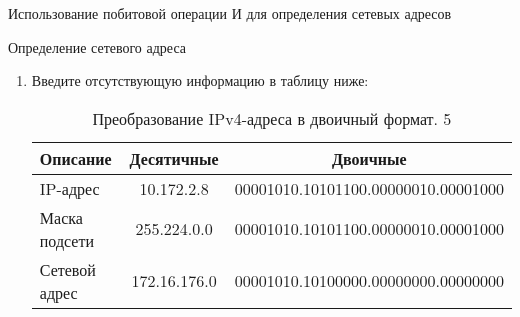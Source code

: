 \documentclass[a4paper,14pt]{extarticle}
\begin{document}
\begin{mypart}{Использование побитовой операции И для определения
		сетевых адресов}
\begin{step}{Определение сетевого адреса}
\begin{enumerate}[label=\alph{enumi}) ]
			\item Введите отсутствующую информацию в таблицу ниже:
			
			\begin{table}[h!]
				\caption{Преобразование IPv4-адреса в двоичный формат. 5}
				\centering
				\begin{tabular}{|l|c|c|}
					\hline
					\textbf{Описание }&\textbf{Десятичные} &\textbf{Двоичные}\\\hline
					IP-адрес &      10.172.2.8   & 00001010.10101100.00000010.00001000\\\hline
					Маска подсети & 255.224.0.0   & 00001010.10101100.00000010.00001000\\\hline
					Сетевой адрес & 172.16.176.0     & 00001010.10100000.00000000.00000000\\\hline
				\end{tabular}
				\label{tab:web6}
			\end{table}
		
		\end{enumerate}
	\end{step}
\end{mypart}
\end{document}
